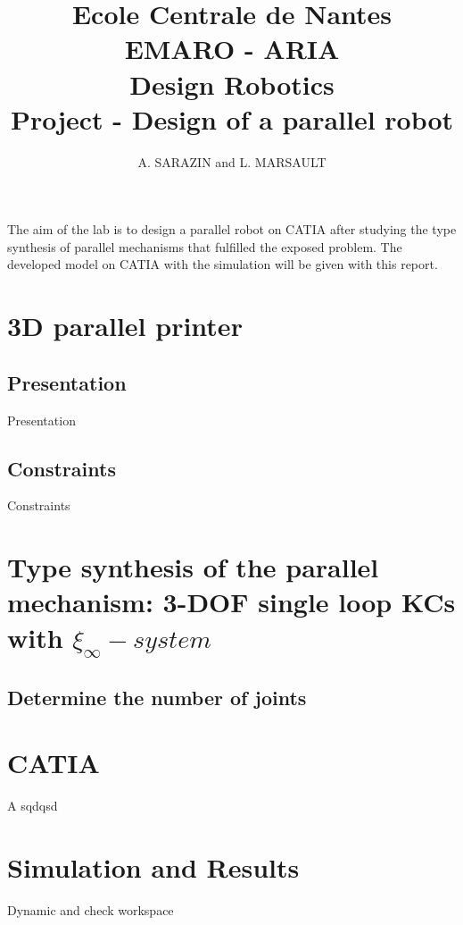 \documentclass[11pt]{article}
\begin{document}
\title{Ecole Centrale de Nantes \\ EMARO - ARIA \\ Design Robotics \\ Project - Design of a parallel robot}
\author{A. SARAZIN and L. MARSAULT}
\date{}
\maketitle

The aim of the lab is to design a parallel robot on CATIA after studying the type synthesis of parallel mechanisms that fulfilled the exposed problem.
The developed model on CATIA with the simulation will be given with this report.

\section{3D parallel printer}
\subsection{Presentation}
Presentation

\subsection{Constraints}
Constraints

\section{Type synthesis of the parallel mechanism: 3-DOF single loop KCs with $\xi_{\infty}-system$}
\subsection{Determine the number of joints}


\section{CATIA}
A
sqdqsd
\section{Simulation and Results}
Dynamic and check workspace
\end{document}
